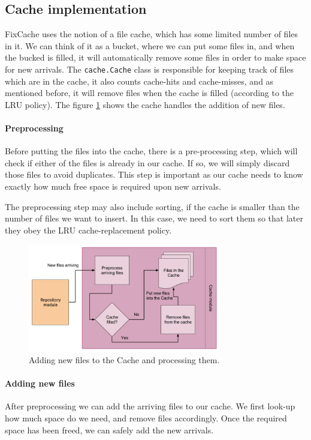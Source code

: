 \documentclass[12pt,twoside,notitlepage]{report}
\newcommand{\fxch}{FixCache}
\begin{document}
\subsection{Cache implementation}
\fxch{} uses the notion of a file cache, which has some limited number of files in it. We can think of it as a bucket, where we can put some files in, and when the bucked is filled, it will automatically remove some files in order to make space for new arrivals. The \texttt{cache.Cache} class is responsible for keeping track of files which are in the cache, it also counts cache-hits  and cache-misses, and as mentioned before, it will remove files when the cache is filled (according to the LRU policy). The figure \ref{cache_module} shows the cache handles the addition of new files.

\paragraph{Preprocessing}
Before putting the files into the cache, there is a pre-processing step, which will check if either of the files is already in our cache. If so, we will simply discard those files to avoid duplicates. This step is important as our cache needs to know exactly how much free space is required upon new arrivals.

The preprocessing step may also include sorting, if the cache is smaller than the number of files we want to insert. In this case, we need to sort them so that later they obey the LRU cache-replacement policy.
\begin{figure}[h]
\centering
    \includegraphics[width=0.75\textwidth]{cache_module.png}
  \caption{Adding new files to the Cache and processing them.}
  \label{cache_module}
\end{figure}

\paragraph{Adding new files} After preprocessing we can add the arriving files to our cache. We first look-up how much space do we need, and remove files accordingly. Once the required space has been freed, we can safely add the new arrivals.
\end{document}
